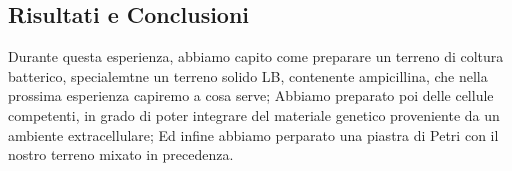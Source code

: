 \subsection{Risultati e Conclusioni}

Durante questa esperienza, abbiamo capito come preparare un terreno di coltura batterico, specialemtne un terreno solido LB, contenente ampicillina, che nella prossima esperienza capiremo a cosa serve;
Abbiamo preparato poi delle cellule competenti, in grado di poter integrare del materiale genetico proveniente da un ambiente extracellulare;
Ed infine abbiamo perparato una piastra di Petri con il nostro terreno mixato in precedenza.
